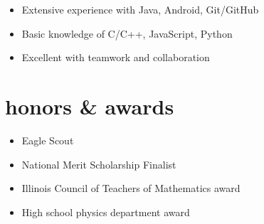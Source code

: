 \documentclass[]{resume}
\begin{document}
\noindent\begin{itemize}[leftmargin=0.45cm]
\setlength{\itemsep}{-5pt}
\item Extensive experience with Java, Android, Git/GitHub
\item Basic knowledge of C/C++, JavaScript, Python
\item Excellent with teamwork and collaboration
\end{itemize}\vspace{\parskip}



\section{honors \& awards}

\noindent\begin{itemize}[leftmargin=0.45cm]
\setlength{\itemsep}{-5pt}
\item Eagle Scout
\item National Merit Scholarship Finalist
\item Illinois Council of Teachers of Mathematics award
\item High school physics department award
\end{itemize}
\end{document}

